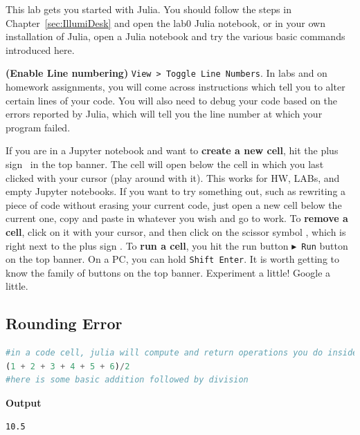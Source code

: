 This lab gets you started with Julia. You should follow the steps in Chapter~\ref{sec:IllumiDesk} and open the lab0 Julia notebook, or in your own installation of Julia, open a Julia notebook and try the various basic commands introduced here.\\

\setlength{\fboxrule}{3pt}%
	\centerline{ %
}



\begin{rem} \textbf{(Enable Line numbering)} \texttt{View > Toggle Line Numbers}. In labs and on homework assignments, you will come across instructions which tell you to alter certain lines of your code. You will also need to debug your code based on the errors reported by Julia, which will tell you the line number at which your program failed. 
\end{rem}

If you are in a Jupyter notebook and want to \textbf{create a new cell}, hit the plus sign  \Plus ~in the top banner. The cell will open below the cell in which you last clicked with your cursor (play around with it). This works for HW, LABs, and empty Jupyter notebooks. If you want to try something out, such as rewriting a piece of code without erasing your current code, just open a new cell below the current one, copy and paste in whatever you wish and go to work. To \textbf{remove a cell}, click on it with your cursor, and then click on the scissor symbol \ScissorHollowRight, which is right next to the plus sign \Plus. To \textbf{run a cell}, you hit the run button $\blacktriangleright$~\texttt{Run} button on the top banner. On a PC, you can hold \texttt{Shift Enter}. It is worth getting to know the family of buttons on the top banner. Experiment a little! Google a little.\\

\setlength{\fboxrule}{3pt}%
	\centerline{ %
}

\subsection{Rounding Error}

\begin{lstlisting}[language=Julia,style=mystyle]
#in a code cell, julia will compute and return operations you do inside it
(1 + 2 + 3 + 4 + 5 + 6)/2
#here is some basic addition followed by division
\end{lstlisting}
\textbf{Output} 
\begin{verbatim}
10.5
\end{verbatim}

